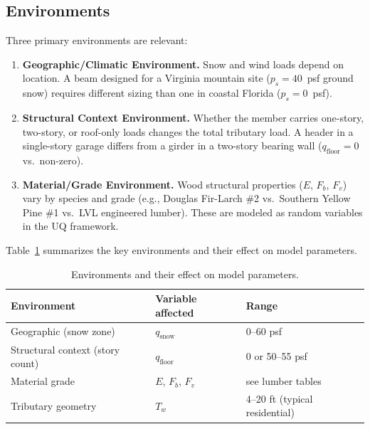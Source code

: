 \subsection{Environments}

Three primary environments are relevant:

\begin{enumerate}
  \item \textbf{Geographic/Climatic Environment.}
  Snow and wind loads depend on location.
  A beam designed for a Virginia mountain site ($p_s = 40$~psf ground snow) requires different sizing than one in coastal Florida ($p_s = 0$~psf).

  \item \textbf{Structural Context Environment.}
  Whether the member carries one-story, two-story, or roof-only loads changes the total tributary load.
  A header in a single-story garage differs from a girder in a two-story bearing wall ($q_{\text{floor}} = 0$ vs.\ non-zero).

  \item \textbf{Material/Grade Environment.}
  Wood structural properties ($E$, $F_b$, $F_v$) vary by species and grade (e.g., Douglas Fir-Larch \#2 vs.\ Southern Yellow Pine \#1 vs.\ LVL engineered lumber).
  These are modeled as random variables in the UQ framework.
\end{enumerate}

Table~\ref{tab:environments} summarizes the key environments and their effect on model parameters.

\begin{table}[ht]
\centering
\caption{Environments and their effect on model parameters.}
\label{tab:environments}
\begin{tabular}{lll}
\toprule
\textbf{Environment} & \textbf{Variable affected} & \textbf{Range} \\
\midrule
Geographic (snow zone) & $q_{\text{snow}}$ & 0--60 psf \\
Structural context (story count) & $q_{\text{floor}}$ & 0 or 50--55 psf \\
Material grade & $E$, $F_b$, $F_v$ & see lumber tables \\
Tributary geometry & $T_w$ & 4--20 ft (typical residential) \\
\bottomrule
\end{tabular}
\end{table}
